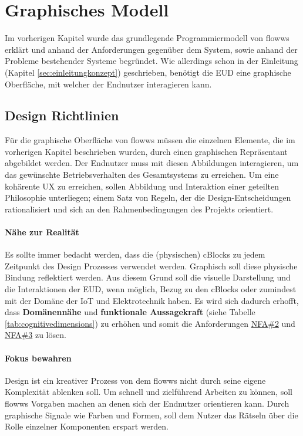 \section{Graphisches Modell}\label{sec:graphischesmodell}
Im vorherigen Kapitel wurde das grundlegende Programmiermodell von flowws erklärt und anhand der Anforderungen gegenüber dem System, sowie anhand der Probleme bestehender Systeme begründet. Wie allerdings schon in der Einleitung (Kapitel \ref{sec:einleitungkonzept}) geschrieben, benötigt die \ac{EUD} eine graphische Oberfläche, mit welcher der Endnutzer interagieren kann. 
 
\subsection{Design Richtlinien}
Für die graphische Oberfläche von flowws müssen die einzelnen Elemente, die im vorherigen Kapitel beschrieben wurden, durch einen graphischen Repräsentant abgebildet werden. Der Endnutzer muss mit diesen Abbildungen interagieren, um das gewünschte Betriebsverhalten des Gesamtsystems zu erreichen. Um eine kohärente \ac{UX} zu erreichen, sollen Abbildung und Interaktion einer geteilten Philosophie unterliegen; einem Satz von Regeln, der die Design-Entscheidungen rationalisiert und sich an den Rahmenbedingungen des Projekts orientiert.

\paragraph{Nähe zur Realität}\label{par:naehezurrealitaet} Es sollte immer bedacht werden, dass die (physischen) cBlocks zu jedem Zeitpunkt des Design Prozesses verwendet werden. Graphisch soll diese physische Bindung reflektiert werden. Aus diesem Grund soll die visuelle Darstellung und die Interaktionen der \ac{EUD}, wenn möglich, Bezug zu den cBlocks oder zumindest mit der Domäne der \ac{IoT} und Elektrotechnik haben. Es wird sich dadurch erhofft, dass \textbf{Domänennähe} und \textbf{funktionale Aussagekraft} (siehe Tabelle \ref{tab:cognitivedimensions}) zu erhöhen und somit die Anforderungen \hyperref[tab:NFA2]{NFA\#2} und  \hyperref[tab:NFA3]{NFA\#3} zu lösen.

\paragraph{Fokus bewahren}\label{par:fokusbewahren} Design ist ein kreativer Prozess von dem flowws nicht durch seine eigene Komplexität ablenken soll. Um schnell und zielführend Arbeiten zu können, soll flowws Vorgaben machen an denen sich der Endnutzer orientieren kann. Durch graphische Signale wie Farben und Formen, soll dem Nutzer das Rätseln über die Rolle einzelner Komponenten erspart werden.


